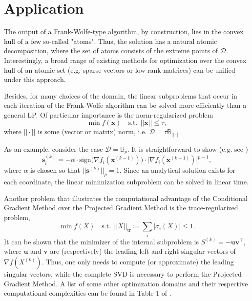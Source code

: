 \documentclass[12pt]{article}
\begin{document}
\section{Application}
The output of a Frank-Wolfe-type algorithm, by construction, lies in the convex hull of a few so-called "atoms". Thus, the solution has a natural atomic decomposition, where the set of atoms consists of the extreme points of $\mathcal{D}$. Interestingly, a broad range of existing methods for optimization over the convex hull of an atomic set (e.g. sparse vectors or low-rank matrices) can be unified under this approach.

Besides, for many choices of the domain, the linear subproblems that occur in each iteration of the Frank-Wolfe algorithm can be solved more efficiently than a general LP. Of particular importance is the norm-regularized problem
\begin{equation}
    \min f(\mathbf{x}) \quad \mathrm{s.t.} \: \: ||\mathbf{x}|| \leq \tau,
\end{equation}
where $||\cdot||$ is some (vector or matrix) norm, i.e. $\mathcal{D} = \tau \mathbb{B}_{||\cdot||}$.

As an example, consider the case $\mathcal{D} = \mathbb{B}_p$. It is straightforward to show (e.g. see \cite{T})
\begin{equation}
    \mathbf{s}^{(k)}_i = -\alpha \cdot \mathrm{sign}\big(\nabla f_i(\mathbf{x}^{(k-1)})\big) \cdot \big|\nabla f_i(\mathbf{x}^{(k-1)}) \big|^{p-1},
\end{equation}
where $\alpha$ is chosen so that $||\mathbf{s}^{(k)}||_p = 1$. Since an analytical solution exists for each coordinate, the linear minimization subproblem can be solved in linear time.

Another problem that illustrates the computational advantage of the Conditional Gradient Method over the Projected Gradient Method is the trace-regularized problem,
\begin{equation}
    \min f(X) \quad \mathrm{s.t.} \: \: ||X||_{\mathrm{tr}} \coloneqq \sum_{i} |\sigma_i(X)| \leq 1.
\end{equation}
It can be shown that the minimizer of the internal subproblem is $S^{(k)} = - \mathbf{u}\mathbf{v}^\top$, where $\mathbf{u}$ and $\mathbf{v}$ are (respectively) the leading left and right singular vectors of $\nabla f(X^{(k)})$. Thus, one only needs to compute (or approximate) the leading singular vectors, while the complete SVD is necessary to perform the Projected Gradient Method. A list of some other optimization domains and their respective computational complexities can be found in Table 1 of \cite{J}.
\end{document}
